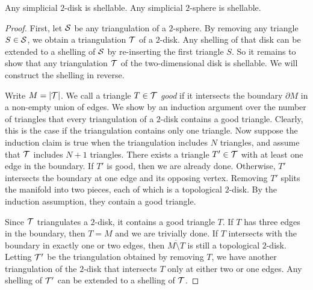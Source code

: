 \documentclass[12pt,a4paper]{article}
\begin{document}
\begin{lemma}    
    Any simplicial $2$-disk is shellable.
    Any simplicial $2$-sphere is shellable. 
\end{lemma}
\begin{proof}
    First, 
    let ${\mathcal S}$ be any triangulation of a $2$-sphere. 
    By removing any triangle $S \in {\mathcal S}$, we obtain a triangulation ${\mathcal T}$ of a $2$-disk.
    Any shelling of that disk can be extended to a shelling of ${\mathcal S}$ by re-inserting the first triangle $S$.
    So it remains to show that any triangulation ${\mathcal T}$ of the two-dimensional disk is shellable. 
    We will construct the shelling in reverse. 
    
    Write $M = |{\mathcal T}|$. 
    We call a triangle $T \in {\mathcal T}$ \emph{good} if it intersects the boundary $\partial M$ in a non-empty union of edges. %
    We show by an induction argument over the number of triangles that every triangulation of a $2$-disk contains a good triangle. 
    Clearly, this is the case if the triangulation contains only one triangle. 
    Now suppose the induction claim is true when the triangulation includes $N$ triangles,
    and assume that ${\mathcal T}$ includes $N+1$ triangles. 
    There exists a triangle $T' \in {\mathcal T}$ with at least one edge in the boundary. 
    If $T'$ is good, then we are already done. 
    Otherwise, $T'$ intersects the boundary at one edge and its opposing vertex.
    Removing $T'$ splits the manifold into two pieces, each of which is a topological $2$-disk.
    By the induction assumption, they contain a good triangle.
    
    Since ${\mathcal T}$ triangulates a $2$-disk,
    it contains a good triangle $T$. 
    If $T$ has three edges in the boundary, then $T = M$ and we are trivially done. 
    If $T$ intersects with the boundary in exactly one or two edges, 
    then $\overline{M \setminus T}$ is still a topological $2$-disk.
    Letting ${\mathcal T}'$ be the triangulation obtained by removing $T$,
    we have another triangulation of the $2$-disk that intersects $T$ only at either two or one edges.
    Any shelling of ${\mathcal T}'$ can be extended to a shelling of ${\mathcal T}$.
%   
\end{proof}
\end{document}
